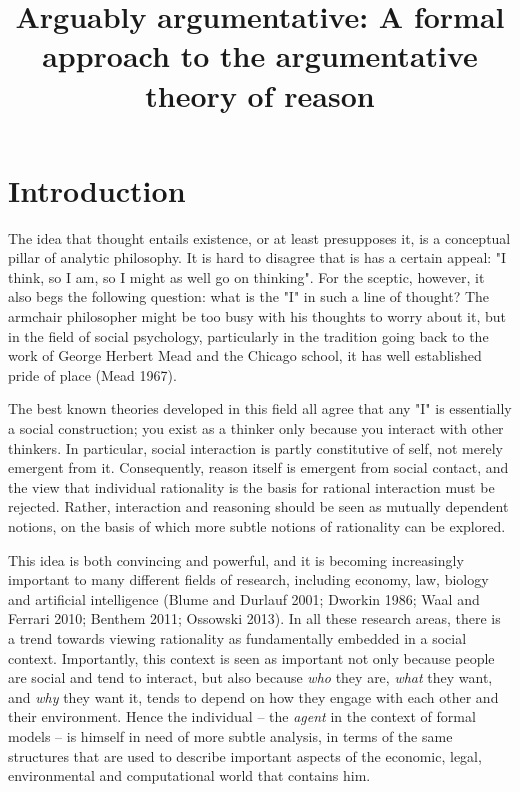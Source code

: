 \documentclass{article}
\title{Arguably argumentative: A formal approach to the argumentative theory of reason}
\begin{document}
\maketitle

\begin{abstract}

\end{abstract}

\section{Introduction}\label{sec:intro}

The idea that thought entails existence, or at least presupposes it, is a conceptual pillar of analytic philosophy. It is hard to disagree that is has a certain appeal: "I think, so I am, so I might as well go on thinking". For the sceptic, however, it also begs the following question: what is the "I" in such a line of thought? The armchair philosopher might be too busy with his thoughts to worry about it, but in the field of social psychology, particularly in the tradition going back to the work of George Herbert Mead and the Chicago school, it has well established pride of place (Mead 1967).

The best known theories developed in this field all agree that any "I" is essentially a social construction; you exist as a thinker only because you interact with other thinkers. In particular, social interaction is partly constitutive of self, not merely emergent from it. Consequently, reason itself is emergent from social contact, and the view that individual rationality is the basis for rational interaction must be rejected. Rather, interaction and reasoning should be seen as mutually dependent notions, on the basis of which more subtle notions of rationality can be explored.

This idea is both convincing and powerful, and it is becoming increasingly important to many different fields of research, including economy, law, biology and artificial intelligence (Blume and Durlauf 2001; Dworkin 1986; Waal and Ferrari 2010; Benthem 2011; Ossowski 2013). In all these research areas, there is a trend towards  viewing rationality as fundamentally embedded in a social context. Importantly, this context is seen as important not only because people are social and tend to interact, but also because \emph{who} they are, \emph{what} they want, and \emph{why} they want it, tends to depend on how they engage with each other and their environment. Hence the individual -- the \emph{agent} in the context of formal models -- is himself in need of more subtle analysis, in terms of the same structures that are used to describe important aspects of the economic, legal, environmental and computational world that contains him. 
\end{document}
